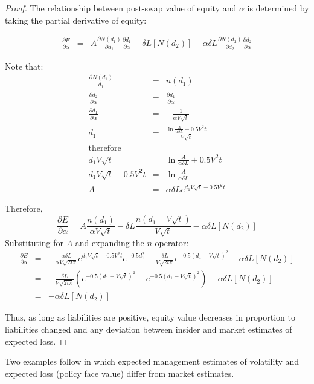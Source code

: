 \begin{proof}
The relationship between post-swap value of equity and $\alpha$ is determined by taking the partial derivative of equity:

\begin{eqnarray}
\frac{\partial E}{\partial \alpha}&=&A \frac{\partial N\left(d_1\right)}{\partial d_1}\frac{\partial d_1}{\partial \alpha}-\delta L \left[N\left(d_2\right)\right]-\alpha \delta L \frac{\partial N\left(d_2\right)}{\partial d_2}\frac{\partial d_2}{\partial \alpha}
\end{eqnarray}

Note that:
\begin{eqnarray}
\frac{\partial N\left(d_1\right)}{d_1}&=&n\left(d_1\right) \nonumber\\
\frac{\partial d_2}{\partial \alpha}&=&\frac{\partial d_1}{\partial \alpha} \nonumber\\
\frac{\partial d_1}{\partial \alpha}&=&-\frac{1}{\alpha V \sqrt{t}} \nonumber\\
d_1&=&\frac{\ln\frac{A}{\alpha \delta L}+0.5 V^2 t}{V\sqrt{t}} \nonumber \\
\mbox{therefore} &&\nonumber \\
d_1 V\sqrt{t}&=&\ln\frac{A}{\alpha \delta L}+0.5 V^2 t\nonumber\\
d_1 V\sqrt{t}-0.5 V^2 t&=&\ln\frac{A}{\alpha \delta L} \nonumber\\
A&=&\alpha \delta L e^{d_1 V\sqrt{t}-0.5 V^2 t }
\end{eqnarray}

Therefore, 
\begin{equation}
\frac{\partial E}{\partial \alpha}=A \frac{n\left(d_1\right)}{\alpha V \sqrt{t}}-\delta L\frac{n\left(d_1-V\sqrt{t}\right)}{V\sqrt{t}}-\alpha \delta L \left[N \left(d_2\right)\right]
\end{equation}
Substituting for $A$ and expanding the $n$ operator:
\begin{eqnarray}
\frac{\partial E}{\partial \alpha}&=&-\frac{\alpha \delta L}{\alpha V\sqrt{2t \pi}} e^{d_1 V\sqrt{t}-0.5 V^2 t} e^{-0.5 d_1^2} -\frac{\delta L}{V\sqrt{2t \pi}}e^{-0.5\left(d_1-V\sqrt{t}\right)^2}-\alpha \delta L \left[N \left(d_2\right)\right] \nonumber\\
&=&-\frac{\delta L}{V\sqrt{2t \pi}}\left(e^{-0.5\left(d_1-V\sqrt{t}\right)^2}-e^{-0.5\left(d_1-V\sqrt{t}\right)^2}\right)-\alpha \delta L \left[N\left(d_2\right)\right]\nonumber\\
&=&-\alpha \delta L \left[N\left(d_2\right)\right]
\end{eqnarray}

Thus, as long as liabilities are positive, equity value decreases in proportion to liabilities changed and any deviation between insider and market estimates of expected loss.

\end{proof}
Two examples follow in which expected management estimates of  volatility and expected loss (policy face value) differ from market estimates.

